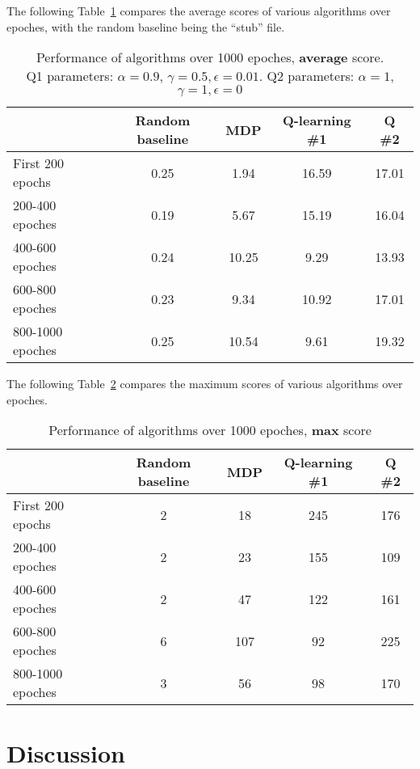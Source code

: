 \documentclass[11pt]{article}
\begin{document}
The following Table~\ref{tab:method_comparison2} compares the average scores of various algorithms over epoches, with the random baseline being the ``stub'' file.
\begin{table}[H]
    \centering
    \caption{Performance of algorithms over 1000 epoches, \textbf{average} score. \\
    Q1 parameters: $\alpha=0.9$, $\gamma=0.5, \epsilon=0.01$. Q2 parameters: $\alpha=1$, $\gamma=1, \epsilon=0$}
    \label{tab:method_comparison2}
    \begin{tabular}{l|c|c|c|c}
         \hline 
         & Random baseline & MDP & Q-learning \#1 & Q \#2 \\
         \hline \hline
    First 200 epochs   & 0.25 & 1.94 &  16.59 & 17.01\\
    200-400 epoches    & 0.19 & 5.67 & 15.19 & 16.04\\
    400-600 epoches   & 0.24 & 10.25 & 9.29 & 13.93  \\
    600-800 epoches   & 0.23 & 9.34 & 10.92 & 17.01\\
    800-1000 epoches   & 0.25 & 10.54 & 9.61 & 19.32\\
    \hline
    \end{tabular}
\end{table}


The following Table~\ref{tab:method_comparison} compares the maximum scores of various algorithms over epoches.
\begin{table}[H]
    \centering
    \caption{Performance of algorithms over 1000 epoches, \textbf{max} score}
    \label{tab:method_comparison}
    \begin{tabular}{l|c|c|c|c}
         \hline 
         & Random baseline & MDP & Q-learning \#1 & Q \#2\\
         \hline \hline
    First 200 epochs   & 2 & 18 & 245 & 176\\
    200-400 epoches    & 2 & 23 & 155 & 109\\
    400-600 epoches   & 2 & 47 & 122 & 161\\
    600-800 epoches   & 6 & 107 & 92 & 225 \\
    800-1000 epoches   & 3 & 56 & 98 & 170 \\
    \hline
    \end{tabular}
\end{table}


\section{Discussion} 
\end{document}
